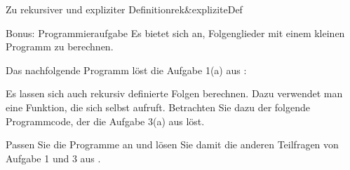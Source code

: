 \begin{ueb}{Zu rekursiver und expliziter Definition}{rek&expliziteDef}
\end{ueb}
\clearpage
\begin{ueb}
    {Bonus: Programmieraufgabe}{}
    Es bietet sich an, Folgenglieder mit einem kleinen Programm zu berechnen.

    Das nachfolgende Programm löst die Aufgabe 1(a) aus :

    

    Es lassen sich auch rekursiv definierte Folgen berechnen. Dazu verwendet man eine Funktion, die sich selbst aufruft. Betrachten Sie dazu der folgende Programmcode, der die Aufgabe 3(a) aus  löst. 

    

    Passen Sie die Programme an und lösen Sie damit die anderen Teilfragen von Aufgabe 1 und 3 aus .
\end{ueb}












